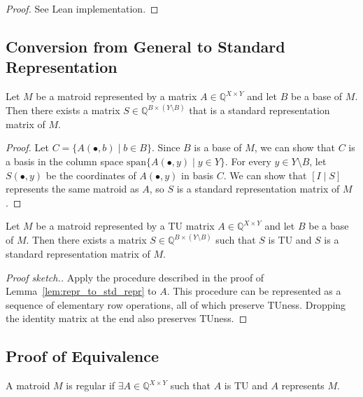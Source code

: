 \begin{proof}
    See Lean implementation.
\end{proof}


\subsection{Conversion from General to Standard Representation}

\begin{lemma}\label{lem:repr_to_std_repr}
    Let $M$ be a matroid represented by a matrix $A \in \mathbb{Q}^{X \times Y}$ and let $B$ be a base of $M$. Then there exists a matrix $S \in \mathbb{Q}^{B \times (Y \setminus B)}$ that is a standard representation matrix of $M$.
\end{lemma}

\begin{proof}
    Let $C = \{A (\bullet, b) \mid b \in B\}$. Since $B$ is a base of $M$, we can show that $C$ is a basis in the column space $\mathrm{span} \{A (\bullet, y) \mid y \in Y\}$. For every $y \in Y \setminus B$, let $S (\bullet, y)$ be the coordinates of $A (\bullet, y)$ in basis $C$. We can show that $[I \mid S]$ represents the same matroid as $A$, so $S$ is a standard representation matrix of $M$.
\end{proof}

\begin{lemma}\label{lem:TU_repr_to_TU_std_repr}
    Let $M$ be a matroid represented by a TU matrix $A \in \mathbb{Q}^{X \times Y}$ and let $B$ be a base of $M$. Then there exists a matrix $S \in \mathbb{Q}^{B \times (Y \setminus B)}$ such that $S$ is TU and $S$ is a standard representation matrix of $M$.
\end{lemma}

\begin{proof}[Proof sketch.]
    Apply the procedure described in the proof of Lemma~\ref{lem:repr_to_std_repr} to $A$. This procedure can be represented as a sequence of elementary row operations, all of which preserve TUness. Dropping the identity matrix at the end also preserves TUness.
\end{proof}


\subsection{Proof of Equivalence}

\begin{definition}\label{def:regular}
    A matroid $M$ is regular if $\exists A \in \mathbb{Q}^{X \times Y}$ such that $A$ is TU and $A$ represents $M$.
\end{definition}

